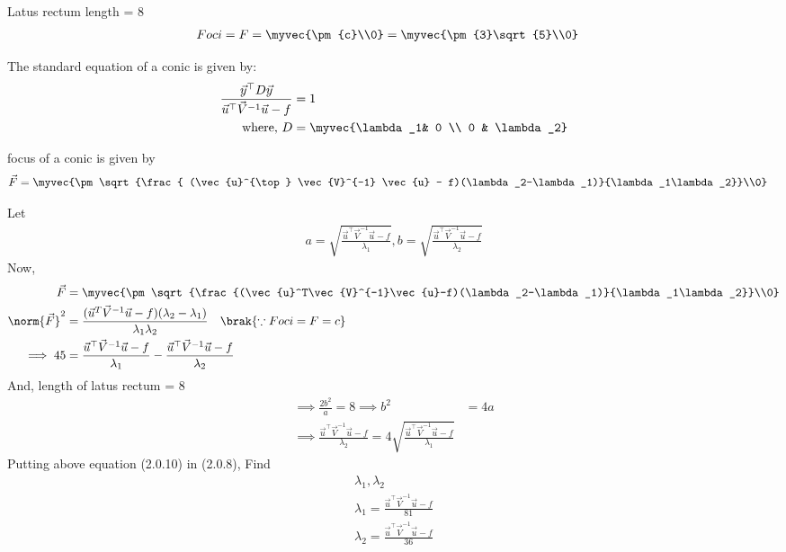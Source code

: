 \documentclass[journal,12pt,twocolumn]{IEEEtran}
\begin{document}
Latus rectum length = 8 
\begin{align}
Foci=F=\myvec{\pm{c}\\0} &=\myvec{\pm{3}\sqrt{5}\\0}
\end{align}
\begin{lemma}
The standard equation of a conic is given by:
\begin{align}
\frac{\vec{y}^{\top}D\vec{y}}{\vec{u}^{\top}\vec{V}^{-1}\vec{u}-f}&=1
\\
\text{where, } D &=\myvec{\lambda_1& 0 \\ 0 & \lambda_2}
\end{align}
\end{lemma}
\begin{lemma}
focus of a conic is given by
\begin{align}
 \vec{F} &=\myvec{\pm\sqrt{\frac{ (\vec{u}^{\top} \vec{V}^{-1} \vec{u} - f)(\lambda_2-\lambda_1)}{\lambda_1\lambda_2}}\\0}
 \end{align}
\end{lemma}
Let
\begin{align}
  a = \sqrt{\frac{\vec{u}^{\top}\vec{V}^{-1}\vec{u}-f}{\lambda_1}},
  b = \sqrt{\frac{\vec{u}^{\top}\vec{V}^{-1}\vec{u}-f}{\lambda_2}}
\end{align}
Now,
\begin{align}
\vec{F} &= \myvec{\pm\sqrt{\frac{(\vec{u}^T\vec{V}^{-1}\vec{u}-f)(\lambda_2-\lambda_1)}{\lambda_1\lambda_2}}\\0}
 \\
 \norm{\vec{F}}^2  &= \frac{(\vec{u}^T\vec{V}^{-1}\vec{u}-f)(\lambda_2-\lambda_1)}{\lambda_1\lambda_2}\quad\brak{\because Foci=F=c}
 \\
\implies 45 &= \frac{\vec{u}^{\top}\vec{V}^{-1}\vec{u}-f}{\lambda_1}-\frac{\vec{u}^{\top}\vec{V}^{-1}\vec{u}-f}{\lambda_2}
\end{align}
And,
length of latus rectum = 8 
\begin{align}
\implies\frac{2b^2}{a} = 8 \implies b^2 &= 4a
\\
\implies \frac{\vec{u}^{\top}\vec{V}^{-1}\vec{u}-f}{\lambda_2} = 4\sqrt{\frac{\vec{u}^{\top}\vec{V}^{-1}\vec{u}-f}{\lambda_1}} 
\end{align}
Putting above equation (2.0.10) in (2.0.8), Find
\begin{align}
\lambda_1,\lambda_2 
\\
\lambda_1=\frac{\vec{u}^{\top}\vec{V}^{-1}\vec{u}-f}{81}
\\
\lambda_2=\frac{\vec{u}^{\top}\vec{V}^{-1}\vec{u}-f}{36}
\end{align}
\end{document}
